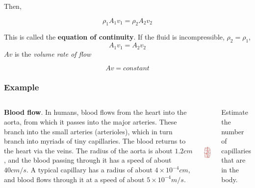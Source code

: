 \documentclass[]{beamer}
\begin{document}
\begin{frame}

Then,

\begin{equation}
\rho_1A_1v_1=\rho_2A_2v_2
\end{equation}

\vspace{3mm}
\pause
This is called the \textbf{equation of continuity}.
\vspace{3mm}
If the fluid is incompressible, $\rho_2=\rho_1$, 
\pause
\begin{equation}
A_1v_1=A_2v_2
\end{equation}
\pause
$Av$ is the \textit{volume rate of flow}
\pause
\vspace{3mm}

\begin{equation*}
  \boxed{Av=constant}
\end{equation*}

  \end{frame}

\setcounter{examplef}{1}

\begin{frame}
  \frametitle{Example \theexamplef }


   \begin{columns}[c]
   \column{2.3in}  %


\textbf{Blood flow}. In humans, blood flows from the heart into the aorta, from which it passes into the major arteries. These branch into the small arteries (arterioles),
 which in turn branch into myriads of tiny capillaries. The blood returns to the heart via the veins. The radius of the aorta is about $1.2 cm$, and the blood passing through it has 
a speed of about $40 cm/s$. A typical capillary has a radius of about $4 \times 10^{-4} cm$, and blood flows through it at a speed of about $5 \times 10^ {-4} m/s$. 




    \begin{center}
  \includegraphics[height=1.9in]{images2/hb.jpg}
\end{center}
Estimate the number of capillaries that are in the body.

   \end{columns}



  \end{frame}
\end{document}
